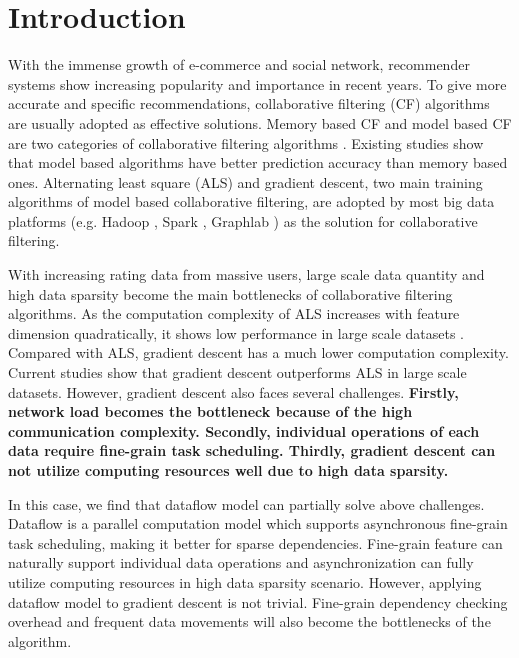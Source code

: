 \documentclass{llncs}
\begin{document}
\section{Introduction}
\vspace{-5pt}

With the immense growth of e-commerce and social network, recommender systems show increasing popularity and importance in recent years. To give more accurate and specific recommendations, collaborative filtering (CF) \cite{towards} algorithms are usually adopted as effective solutions. Memory based CF and model based CF are two categories of collaborative filtering algorithms \cite{MemoryBasedCF}. Existing studies \cite{MF2009} \cite{recSurvey2013} show that model based algorithms have better prediction accuracy than memory based ones.
Alternating least square (ALS) and gradient descent, two main training algorithms of model based collaborative filtering, are adopted by most big data platforms (e.g. Hadoop \cite{Hadoop}, Spark \cite{SparkMllib}, Graphlab \cite{graphlab}) as the solution for collaborative filtering.

With increasing rating data from massive users, large scale data quantity and high data sparsity become the main bottlenecks of collaborative filtering algorithms. As the computation complexity of ALS increases with feature dimension quadratically, it shows low performance in large scale datasets \cite{ibm2011}. Compared with ALS, gradient descent has a much lower computation complexity. Current studies \cite{sgdKdd2015} \cite{sgdFast2015} \cite{ibm2011} show that gradient descent outperforms ALS in large scale datasets. However, gradient descent also faces several challenges. \textbf{Firstly, network load becomes the bottleneck because of the high communication complexity. Secondly, individual operations of each data require fine-grain task scheduling. Thirdly, gradient descent can not utilize computing resources well due to high data sparsity.}

In this case, we find that dataflow model can partially solve above challenges.
Dataflow \cite{dataflow} is a parallel computation model which
supports asynchronous fine-grain task scheduling, making it
better for sparse dependencies. Fine-grain feature can naturally support individual data operations and asynchronization can fully utilize computing resources in high data sparsity scenario. However, applying dataflow model to gradient descent is not trivial. Fine-grain dependency checking overhead and frequent data movements will also become the bottlenecks of the algorithm.
\end{document}
